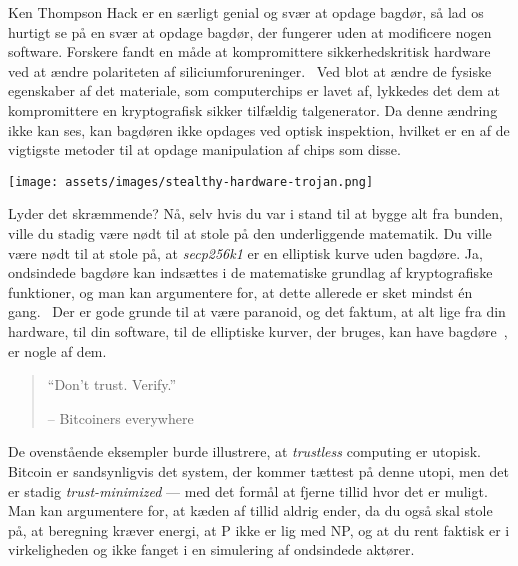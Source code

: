 Ken Thompson Hack er en særligt genial og svær at opdage bagdør,
så lad os hurtigt se på en svær at opdage bagdør, der fungerer uden at
modificere nogen software. Forskere fandt en måde at kompromittere sikkerhedskritisk
hardware ved at ændre polariteten af siliciumforureninger.~\cite{becker2013stealthy} Ved blot at ændre de fysiske egenskaber
af det materiale, som computerchips er lavet af, lykkedes det dem at kompromittere en
kryptografisk sikker tilfældig talgenerator. Da denne ændring ikke kan ses,
kan bagdøren ikke opdages ved optisk inspektion, hvilket er en af de
vigtigste metoder til at opdage manipulation af chips som disse.

\begin{center}
  \texttt{[image: assets/images/stealthy-hardware-trojan.png]}
  \label{fig:stealthy-hardware-trojan}
\end{center}

Lyder det skræmmende? Nå, selv hvis du var i stand til at bygge alt fra
bunden, ville du stadig være nødt til at stole på den underliggende matematik. Du
ville være nødt til at stole på, at \textit{secp256k1} er en elliptisk kurve uden
bagdøre. Ja, ondsindede bagdøre kan indsættes i de matematiske
grundlag af kryptografiske funktioner, og man kan argumentere for, at dette allerede
er sket mindst én gang.~\cite{wiki:Dual_EC_DRBG} Der er gode grunde til at være paranoid, og
det faktum, at alt lige fra din hardware, til din software, til de
elliptiske kurver, der bruges, kan have bagdøre~\cite{wiki:backdoors}, er nogle af dem.

\begin{quotation}\begin{samepage}
  \enquote{Don't trust. Verify.}
  \begin{flushright} -- Bitcoiners everywhere
\end{flushright}\end{samepage}\end{quotation}

De ovenstående eksempler burde illustrere, at \textit{trustless} computing er
utopisk. Bitcoin er sandsynligvis det system, der kommer tættest på denne
utopi, men det er stadig \textit{trust-minimized} --- med det formål at fjerne tillid
hvor det er muligt. Man kan argumentere for, at kæden af tillid aldrig ender, da
du også skal stole på, at beregning kræver energi, at P ikke er lig med NP, og at du rent faktisk er i virkeligheden og ikke
fanget i en simulering af ondsindede aktører.

